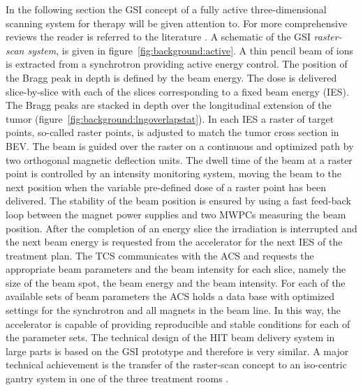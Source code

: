 In the following section the \ac{GSI} concept of a fully active
three-dimensional scanning system for therapy will be given attention
to. For more comprehensive reviews the reader is referred to the
literature \citep{Haberer1993,Kraft2000,Schardt2010}. A schematic of
the \ac{GSI} \emph{raster-scan system}, is given in
figure~\vref{fig:background:active}. A thin pencil beam of \Ctw ions
is extracted from a synchrotron providing active energy control. The
position of the Bragg peak in depth is defined by the beam energy. The
dose is delivered slice-by-slice with each of the slices corresponding
to a fixed beam energy (\ac{IES}). The Bragg peaks are stacked in
depth over the longitudinal extension of the tumor
(figure~\ref{fig:background:lngoverlapstat}). In each \ac{IES} a raster
of target points, so-called raster points, is adjusted to match the
tumor cross section in \ac{BEV}. The beam is guided over the raster on
a continuous and optimized path by two orthogonal magnetic deflection
units. The dwell time of the beam at a raster point is controlled by
an intensity monitoring system, moving the beam to the next
position when the variable pre-defined dose of a raster point has been
delivered. The stability of the beam position is ensured by using a
fast feed-back loop between the magnet power supplies and two
\acp{MWPC} measuring the beam position. After the completion of an
energy slice the irradiation is interrupted and the next beam energy
is requested from the accelerator for the next \ac{IES} of the
treatment plan. The \ac{TCS} communicates with the \ac{ACS} and
requests the appropriate beam parameters and the beam intensity for
each slice, namely the size of the beam spot, the beam energy and the
beam intensity. For each of the available sets of beam parameters the
\ac{ACS} holds a data base with optimized settings for the synchrotron
and all magnets in the beam line. In this way, the accelerator is
capable of providing reproducible and stable conditions for each of
the parameter sets. The technical design of the \ac{HIT}
beam delivery system in large parts is based on the \ac{GSI} prototype
and therefore is very similar.  A major technical achievement is the
transfer of the raster-scan concept to an iso-centric gantry system in
one of the three treatment rooms \citep{Haberer2004}.


